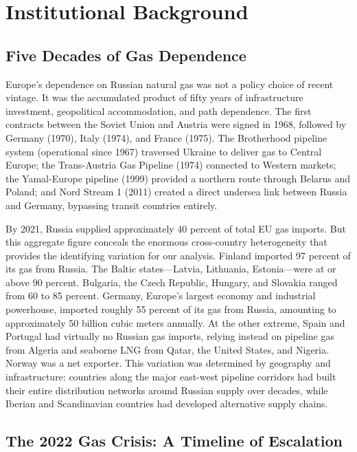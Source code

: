 \documentclass[12pt]{article}
\begin{document}
\section{Institutional Background}
\label{sec:background}

\subsection{Five Decades of Gas Dependence}

Europe's dependence on Russian natural gas was not a policy choice of recent vintage. It was the accumulated product of fifty years of infrastructure investment, geopolitical accommodation, and path dependence. The first contracts between the Soviet Union and Austria were signed in 1968, followed by Germany (1970), Italy (1974), and France (1975). The Brotherhood pipeline system (operational since 1967) traversed Ukraine to deliver gas to Central Europe; the Trans-Austria Gas Pipeline (1974) connected to Western markets; the Yamal-Europe pipeline (1999) provided a northern route through Belarus and Poland; and Nord Stream 1 (2011) created a direct undersea link between Russia and Germany, bypassing transit countries entirely.

By 2021, Russia supplied approximately 40 percent of total EU gas imports. But this aggregate figure conceals the enormous cross-country heterogeneity that provides the identifying variation for our analysis. Finland imported 97 percent of its gas from Russia. The Baltic states---Latvia, Lithuania, Estonia---were at or above 90 percent. Bulgaria, the Czech Republic, Hungary, and Slovakia ranged from 60 to 85 percent. Germany, Europe's largest economy and industrial powerhouse, imported roughly 55 percent of its gas from Russia, amounting to approximately 50 billion cubic meters annually. At the other extreme, Spain and Portugal had virtually no Russian gas imports, relying instead on pipeline gas from Algeria and seaborne LNG from Qatar, the United States, and Nigeria. Norway was a net exporter. This variation was determined by geography and infrastructure: countries along the major east-west pipeline corridors had built their entire distribution networks around Russian supply over decades, while Iberian and Scandinavian countries had developed alternative supply chains.

\subsection{The 2022 Gas Crisis: A Timeline of Escalation}
\end{document}
